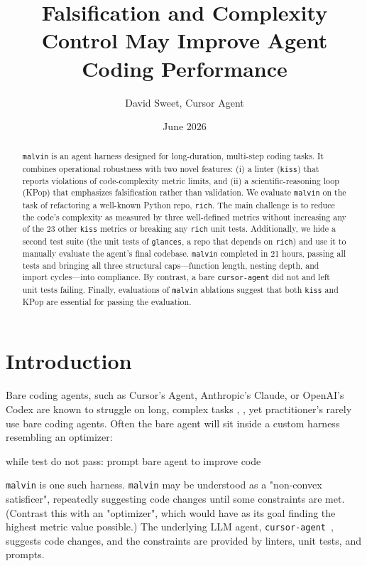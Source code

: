 \documentclass[11pt]{article}
\title{Falsification and Complexity Control May Improve Agent Coding Performance}
\author{David Sweet, Cursor Agent}
\date{June 2026}
\begin{document}
\maketitle

\begin{abstract}
\texttt{malvin} is an agent harness designed for long-duration, multi-step coding tasks. It combines operational 
robustness with two novel features: (i) a linter (\texttt{kiss}) that reports violations of code-complexity metric
 limits, and (ii) a scientific-reasoning loop (KPop) that emphasizes falsification rather than validation.
We evaluate \texttt{malvin} on 
 the task of refactoring a well-known Python repo, \texttt{rich}. The main challenge is to reduce the code's complexity
  as measured by three well-defined metrics without increasing any of the 23 other \texttt{kiss} metrics
  or breaking any \texttt{rich} unit 
  tests. Additionally, we hide a second test suite (the unit tests of \texttt{glances}, a repo that depends 
  on \texttt{rich}) and use 
  it to manually evaluate the agent's final codebase. \texttt{malvin}
  completed in 21 hours, passing all tests and bringing all three structural
  caps---function length, nesting depth, and import
  cycles---into compliance. By contrast, a bare \texttt{cursor-agent} did not and left unit tests failing. Finally,
  evaluations of \texttt{malvin} ablations suggest that
  both \texttt{kiss} and KPop are essential for passing the evaluation.
\end{abstract}

\section{Introduction}
\label{sec:introduction}


Bare coding agents, such as Cursor's Agent, Anthropic's Claude, or OpenAI's Codex are known to struggle on
long, complex tasks \cite{ProgramBench}, \cite{FrontierCode}, yet practitioner's rarely
use bare coding agents. Often the bare agent will sit inside a custom harness resembling an optimizer:

\begin{kpopdef}
while test do not pass:
  prompt bare agent to improve code
\end{kpopdef}

\texttt{malvin} is one such harness. \texttt{malvin} may be understood as a "non-convex satisficer", repeatedly suggesting code 
changes until some constraints are met. (Contrast this with an "optimizer", which would have as its goal finding
 the highest metric value possible.) The underlying LLM agent, \texttt{cursor-agent}~\cite{cursor-agent-cli}, suggests code changes,
  and the constraints
 are provided by linters, unit tests, and prompts.
 
\end{document}
